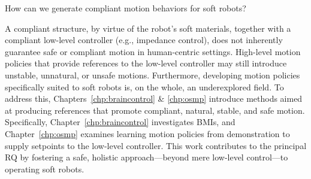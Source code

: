 \begin{researchquestion}\label{rq:compliant_motion_behaviors}
    How can we generate compliant motion behaviors for soft robots?
\end{researchquestion}
A compliant structure, by virtue of the robot’s soft materials, together with a compliant low-level controller (e.g., impedance control), does not inherently guarantee safe or compliant motion in human-centric settings. High-level motion policies that provide references to the low-level controller may still introduce unstable, unnatural, or unsafe motions. Furthermore, developing motion policies specifically suited to soft robots is, on the whole, an underexplored field.
%
To address this, Chapters~\ref{chp:braincontrol} \& \ref{chp:osmp} introduce methods aimed at producing references that promote compliant, natural, stable, and safe motion. Specifically, Chapter~\ref{chp:braincontrol} investigates \glspl{BMI}, and Chapter~\ref{chp:osmp} examines learning motion policies from demonstration to supply setpoints to the low-level controller. This work contributes to the principal \gls{RQ} by fostering a safe, holistic approach—beyond mere low-level control—to operating soft robots.
